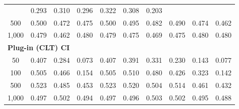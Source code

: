\documentclass{article}
\numberwithin{equation}{section}
\begin{document}
\begin{table}[ht]
\begin{tabular}{c|ccc|cccccc}
& 0.293 & \cellcolor{covheat!5!white}0.310 & 0.296 & \cellcolor{covheat!11!white}0.322 & \cellcolor{covheat!4!white}0.308 & 0.203 \\
500
& \cellcolor{covheat!100!white}0.500 & \cellcolor{covheat!86!white}0.472 & \cellcolor{covheat!87!white}0.475
& \cellcolor{covheat!100!white}0.500 & \cellcolor{covheat!98!white}0.495 & \cellcolor{covheat!91!white}0.482 & \cellcolor{covheat!95!white}0.490 & \cellcolor{covheat!87!white}0.474 & \cellcolor{covheat!81!white}0.462 \\
1{,}000
& \cellcolor{covheat!89!white}0.479 & \cellcolor{covheat!81!white}0.462 & \cellcolor{covheat!90!white}0.480
& \cellcolor{covheat!89!white}0.479 & \cellcolor{covheat!87!white}0.475 & \cellcolor{covheat!84!white}0.469 & \cellcolor{covheat!87!white}0.475 & \cellcolor{covheat!90!white}0.480 & \cellcolor{covheat!90!white}0.480 \\
\hline
\multicolumn{10}{l}{\textbf{Plug-in (CLT) CI}} \\ \hline
50
& \cellcolor{covheat!53!white}0.407 & 0.284 & 0.073
& \cellcolor{covheat!53!white}0.407 & \cellcolor{covheat!46!white}0.391 & \cellcolor{covheat!16!white}0.331 & 0.230 & 0.143 & 0.077 \\
100
& \cellcolor{covheat!100!white}0.505 & \cellcolor{covheat!83!white}0.466 & 0.154
& \cellcolor{covheat!100!white}0.505 & \cellcolor{covheat!100!white}0.510 & \cellcolor{covheat!90!white}0.480 & \cellcolor{covheat!63!white}0.426 & \cellcolor{covheat!12!white}0.323 & 0.142 \\
500
& \cellcolor{covheat!100!white}0.523 & \cellcolor{covheat!92!white}0.485 & \cellcolor{covheat!77!white}0.453
& \cellcolor{covheat!100!white}0.523 & \cellcolor{covheat!100!white}0.520 & \cellcolor{covheat!100!white}0.504 & \cellcolor{covheat!100!white}0.514 & \cellcolor{covheat!81!white}0.461 & \cellcolor{covheat!66!white}0.432 \\
1{,}000
& \cellcolor{covheat!98!white}0.497 & \cellcolor{covheat!100!white}0.502 & \cellcolor{covheat!97!white}0.494
& \cellcolor{covheat!98!white}0.497 & \cellcolor{covheat!98!white}0.496 & \cellcolor{covheat!100!white}0.503 & \cellcolor{covheat!100!white}0.502 & \cellcolor{covheat!98!white}0.495 & \cellcolor{covheat!94!white}0.488 \\
\hline
\end{tabular}
\end{table}

\clearpage
\end{document}
